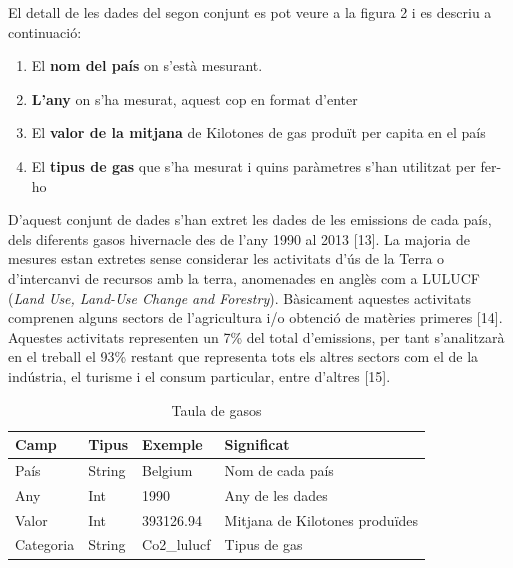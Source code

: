 \documentclass[10pt,a4paper,twocolumn,twoside]{article}
\begin{document}
El detall de les dades del segon conjunt es pot veure a la figura 2 i es descriu a continuació:
\begin{enumerate}
\item El \textbf{nom del país} on s'està mesurant.
\item \textbf{L'any} on s'ha mesurat, aquest cop en format d'enter
\item El \textbf{valor de la mitjana} de Kilotones de gas produït per capita en el país
\item El \textbf{tipus de gas} que s'ha mesurat i quins paràmetres s'han utilitzat per fer-ho
\end{enumerate}

D'aquest conjunt de dades s'han extret les dades de les emissions de cada país, dels diferents gasos hivernacle des de l'any 1990 al 2013 [13]. La majoria de mesures estan extretes sense considerar les activitats d'ús de la Terra o d'intercanvi de recursos amb la terra, anomenades en anglès com a LULUCF (\textit{Land Use, Land-Use Change and Forestry}). Bàsicament aquestes activitats comprenen alguns sectors de l'agricultura i/o obtenció de matèries primeres [14]. Aquestes activitats representen un 7\% del total d'emissions, per tant s'analitzarà en el treball el 93\% restant que representa tots els altres sectors com el de la indústria, el turisme i el consum particular, entre d'altres [15].

\begin{table}[th]
\caption{Taula de gasos}
\begin{center}
\begin{tabular}{  m{1cm} m{1cm} m{1.2cm} m{2.8cm} }
\hline\hline %
Camp & Tipus & Exemple & Significat \\
\hline
País & String & Belgium & Nom de cada país \\
\hline
Any & Int & 1990 & Any de les dades \\
\hline
Valor & Int & 393126.94 & Mitjana de Kilotones produïdes \\
\hline
Categoria & String & Co2\_lulucf  & Tipus de gas\\
\hline
\hline
\end{tabular}
\end{center}
\end{table}
\end{document}
